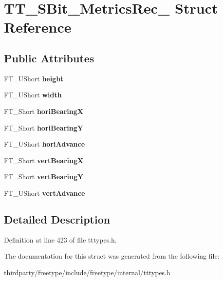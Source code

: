 \hypertarget{struct_t_t___s_bit___metrics_rec__}{}\section{T\+T\+\_\+\+S\+Bit\+\_\+\+Metrics\+Rec\+\_\+ Struct Reference}
\label{struct_t_t___s_bit___metrics_rec__}
\subsection*{Public Attributes}
\begin{DoxyCompactItemize}
\item 
\mbox{\label{struct_t_t___s_bit___metrics_rec___abf873bc8f20ef5e3f951035d004b111a}} 
F\+T\+\_\+\+U\+Short {\bfseries height}
\item 
\mbox{\label{struct_t_t___s_bit___metrics_rec___acbb91730fb9201741d0e33f16b38b815}} 
F\+T\+\_\+\+U\+Short {\bfseries width}
\item 
\mbox{\label{struct_t_t___s_bit___metrics_rec___a2f9707efc2af0e2f5c1366d06b36dc41}} 
F\+T\+\_\+\+Short {\bfseries hori\+BearingX}
\item 
\mbox{\label{struct_t_t___s_bit___metrics_rec___a6d1198143ff292d14036e630a1f5470c}} 
F\+T\+\_\+\+Short {\bfseries hori\+BearingY}
\item 
\mbox{\label{struct_t_t___s_bit___metrics_rec___a5e1c50427d7168f749afa3ae3a6c19b8}} 
F\+T\+\_\+\+U\+Short {\bfseries hori\+Advance}
\item 
\mbox{\label{struct_t_t___s_bit___metrics_rec___a8f9290fe72d470b5a3d1b3cf51e50c78}} 
F\+T\+\_\+\+Short {\bfseries vert\+BearingX}
\item 
\mbox{\label{struct_t_t___s_bit___metrics_rec___a1b3240b24ca4acf498b803a84aa659ec}} 
F\+T\+\_\+\+Short {\bfseries vert\+BearingY}
\item 
\mbox{\label{struct_t_t___s_bit___metrics_rec___afdef8b583a6e7925727a6ff707f33051}} 
F\+T\+\_\+\+U\+Short {\bfseries vert\+Advance}
\end{DoxyCompactItemize}


\subsection{Detailed Description}


Definition at line 423 of file tttypes.\+h.



The documentation for this struct was generated from the following file\+:\begin{DoxyCompactItemize}
\item 
thirdparty/freetype/include/freetype/internal/tttypes.\+h\end{DoxyCompactItemize}
